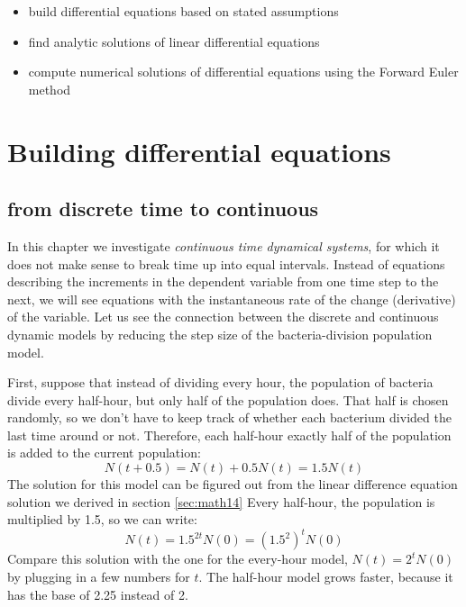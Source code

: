 \documentclass[
]{book}
\theoremstyle{definition}
\theoremstyle{definition}
\theoremstyle{definition}
\theoremstyle{remark}
\begin{document}
\begin{itemize}
\item
  build differential equations based on stated assumptions
\item
  find analytic solutions of linear differential equations
\item
  compute numerical solutions of differential equations using the Forward Euler method
\end{itemize}

\hypertarget{building-differential-equations}{%
\section{Building differential equations}\label{building-differential-equations}}

\label{sec:model15}

\hypertarget{from-discrete-time-to-continuous}{%
\subsection{from discrete time to continuous}\label{from-discrete-time-to-continuous}}

In this chapter we investigate  \emph{continuous time dynamical systems}, for which it does not make sense to break time up into equal intervals. Instead of equations describing the increments in the dependent variable from one time step to the next, we will see equations with the instantaneous rate of the change (derivative) of the variable. Let us see the connection between the discrete and continuous dynamic models by reducing the step size of the bacteria-division population model.

First, suppose that instead of dividing every hour, the population of bacteria divide every half-hour, but only half of the population does. That half is chosen randomly, so we don't have to keep track of whether each bacterium divided the last time around or not. Therefore, each half-hour exactly half of the population is added to the current population:
\[ N(t+0.5) = N(t) + 0.5N(t) = 1.5N(t)\]
The solution for this model can be figured out from the linear difference equation solution we derived in section \ref{sec:math14} Every half-hour, the population is multiplied by 1.5, so we can write:
\[ N(t) = 1.5^{2t} N(0) = (1.5^2)^t N(0)\]
Compare this solution with the one for the every-hour model, \(N(t) = 2^t N(0)\) by plugging in a few numbers for \(t\). The half-hour model grows faster, because it has the base of 2.25 instead of 2.
\end{document}
